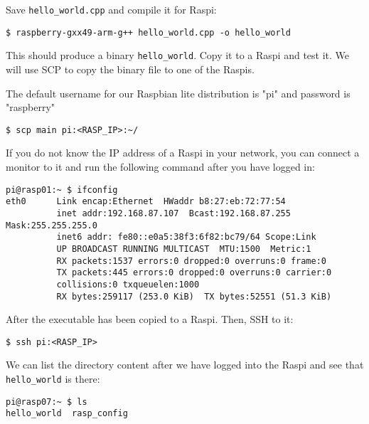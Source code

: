Save \texttt{hello\_world.cpp} and compile it for \ac{Raspi}:

\begin{lstlisting}[]
$ raspberry-gxx49-arm-g++ hello_world.cpp -o hello_world
\end{lstlisting}
\FloatBarrier
\vspace{-5mm}

This should produce a binary \texttt{hello\_world}. Copy it to a \ac{Raspi}
and test it. We will use \ac{SCP} to copy the binary file to one of the \ac{Raspi}s.

The default username for our Raspbian lite distribution is "pi" and password is "raspberry"

\begin{lstlisting}[]
$ scp main pi:<RASP_IP>:~/
\end{lstlisting}
\FloatBarrier
\vspace{-5mm}

If you do not know the \ac{IP} address of a \ac{Raspi} in your network, you can
connect a monitor to it and run the following command after you have logged in:
\begin{lstlisting}[]
pi@rasp01:~ $ ifconfig
eth0      Link encap:Ethernet  HWaddr b8:27:eb:72:77:54
          inet addr:192.168.87.107  Bcast:192.168.87.255  Mask:255.255.255.0
          inet6 addr: fe80::e0a5:38f3:6f82:bc79/64 Scope:Link
          UP BROADCAST RUNNING MULTICAST  MTU:1500  Metric:1
          RX packets:1537 errors:0 dropped:0 overruns:0 frame:0
          TX packets:445 errors:0 dropped:0 overruns:0 carrier:0
          collisions:0 txqueuelen:1000
          RX bytes:259117 (253.0 KiB)  TX bytes:52551 (51.3 KiB)

\end{lstlisting}
\FloatBarrier
\vspace{-5mm}

After the executable has been copied to a \ac{Raspi}. Then, \ac{SSH} to it:

\begin{lstlisting}[]
$ ssh pi:<RASP_IP>
\end{lstlisting}
\FloatBarrier
\vspace{-5mm}

We can list the directory content after we have logged into the \ac{Raspi} and
see that \texttt{hello\_world} is there:

\begin{lstlisting}[]
pi@rasp07:~ $ ls
hello_world  rasp_config
\end{lstlisting}
\FloatBarrier
\vspace{-5mm}

